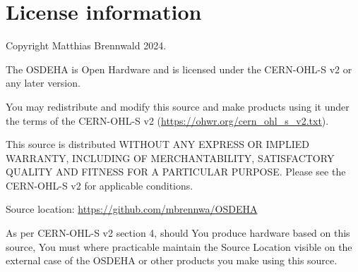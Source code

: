 \section{License information}
Copyright Matthias Brennwald 2024.                                                    

The OSDEHA is Open Hardware and is licensed under the CERN-OHL-S v2 or any later version.

You may redistribute and modify this source and make products using it under the terms of the CERN-OHL-S v2 (\url{https://ohwr.org/cern_ohl_s_v2.txt}).

This source is distributed WITHOUT ANY EXPRESS OR IMPLIED WARRANTY, INCLUDING OF MERCHANTABILITY, SATISFACTORY QUALITY AND FITNESS FOR A PARTICULAR PURPOSE. Please see the CERN-OHL-S v2 for applicable conditions.

Source location: \url{https://github.com/mbrennwa/OSDEHA}

As per CERN-OHL-S v2 section 4, should You produce hardware based on this source, You must where practicable maintain the Source Location visible on the external case of the OSDEHA or other products you make using this source.            


% 
% 


